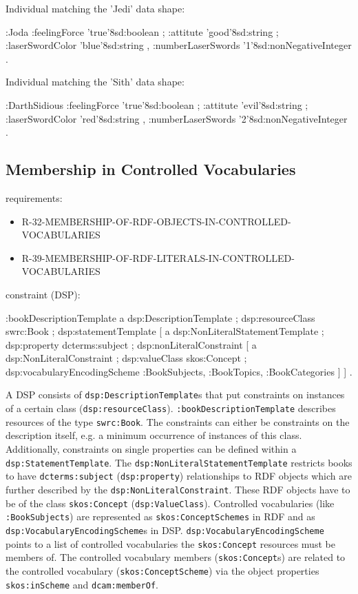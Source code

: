 \documentclass{llncs}
\newcommand{\ms}[1]{\texttt{#1}}
\begin{document}
Individual matching the 'Jedi' data shape:

\begin{ex}
:Joda 
    :feelingForce 'true'^^xsd:boolean ;
    :attitute 'good'^^xsd:string ;
    :laserSwordColor 'blue'^^xsd:string ,
    :numberLaserSwords '1'^^xsd:nonNegativeInteger .
\end{ex}

Individual matching the 'Sith' data shape:

\begin{ex}
:DarthSidious
    :feelingForce 'true'^^xsd:boolean ;
    :attitute 'evil'^^xsd:string ;
    :laserSwordColor 'red'^^xsd:string ,
    :numberLaserSwords '2'^^xsd:nonNegativeInteger . 
\end{ex}

\subsection{Membership in Controlled Vocabularies}

requirements:

\begin{itemize}
	\item R-32-MEMBERSHIP-OF-RDF-OBJECTS-IN-CONTROLLED-VOCABULARIES
	\item R-39-MEMBERSHIP-OF-RDF-LITERALS-IN-CONTROLLED-VOCABULARIES
\end{itemize}

constraint (DSP):

\begin{ex}
:bookDescriptionTemplate 
    a dsp:DescriptionTemplate ;
    dsp:resourceClass swrc:Book ; 
    dsp:statementTemplate [
        a dsp:NonLiteralStatementTemplate ;
        dsp:property dcterms:subject ; 
        dsp:nonLiteralConstraint [ 
            a dsp:NonLiteralConstraint ;
            dsp:valueClass skos:Concept ; 
            dsp:vocabularyEncodingScheme :BookSubjects, :BookTopics, :BookCategories ] ] .
\end{ex}

A DSP consists of \ms{dsp:DescriptionTemplate}s that put constraints on instances of a certain class (\ms{dsp:resourceClass}). 
\ms{:bookDescriptionTemplate} describes resources of the type \ms{swrc:Book}.
The constraints can either be constraints on the description itself, e.g. a minimum occurrence of instances of this class. Additionally, constraints on single properties can be defined within a \ms{dsp:StatementTemplate}.
The \ms{dsp:NonLiteralStatementTemplate} restricts books to have \ms{dcterms:subject} (\ms{dsp:property}) relationships to RDF objects which are further described by the \ms{dsp:NonLiteralConstraint}.
These RDF objects have to be of the class \ms{skos:Concept} (\ms{dsp:ValueClass}).
Controlled vocabularies (like \ms{:BookSubjects}) are represented as \ms{skos:ConceptSchemes} in RDF and as \ms{dsp:VocabularyEncodingScheme}s in DSP.
\ms{dsp:VocabularyEncodingScheme} points to a list of controlled vocabularies the \ms{skos:Concept} resources must be members of.
The controlled vocabulary members (\ms{skos:Concept}s) are related to the controlled vocabulary (\ms{skos:ConceptScheme}) via the object properties \ms{skos:inScheme} and \ms{dcam:memberOf}.
\end{document}
